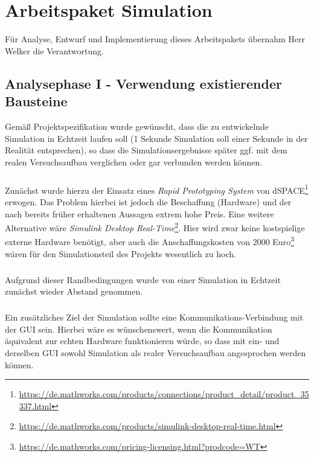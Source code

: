 


\chapter{Arbeitspaket Simulation}
Für Analyse, Entwurf und Implementierung dieses Arbeitspakets übernahm Herr Welker die Verantwortung.

\section{Analysephase I - Verwendung existierender Bausteine}
Gemäß Projektspezifikation wurde gewünscht, dass die zu entwickelnde Simulation in Echtzeit laufen soll (1 Sekunde Simulation soll einer Sekunde in der Realität entsprechen), so dass die Simulationsergebnisse später ggf. mit dem realen Versuchsaufbau verglichen oder gar verbunden werden können. 

\paragraph{}
Zunächst wurde hierzu der Einsatz eines \textit{Rapid Prototyping System} von dSPACE\footnote{\url{https://de.mathworks.com/products/connections/product_detail/product_35337.html}} erwogen.
Das Problem hierbei ist jedoch die Beschaffung (Hardware) und der nach bereits früher erhaltenen Aussagen extrem hohe Preis. 
Eine weitere Alternative wäre \textit{Simulink Desktop Real-Time}\footnote{\url{https://de.mathworks.com/products/simulink-desktop-real-time.html}}.
Hier wird zwar keine kostspielige externe Hardware benötigt, aber auch die Anschaffungskosten von 2000 Euro\footnote{\url{https://de.mathworks.com/pricing-licensing.html?prodcode=WT}}
wären für den Simulationsteil des Projekts wesentlich zu hoch. 

\paragraph{}
Aufgrund dieser Randbedingungen wurde von einer Simulation in Echtzeit zunächst wieder Abstand genommen.

\paragraph{}
Ein zusätzliches Ziel der Simulation sollte eine Kommunikations-Verbindung mit der GUI sein. Hierbei wäre es wünschenswert, wenn die Kommunikation äquivalent zur echten Hardware funktionieren würde, so dass mit ein- und derselben GUI sowohl Simulation als realer Versuchsaufbau angesprochen werden können. 

